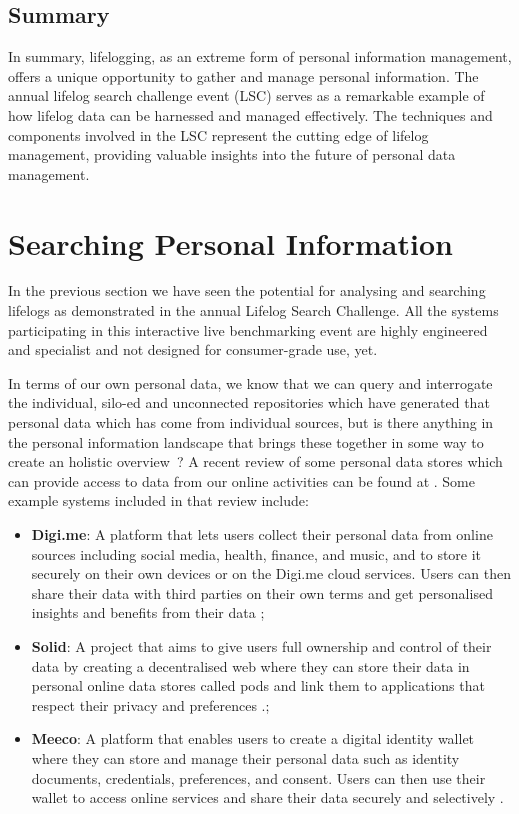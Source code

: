 \documentclass[11pt]{article}
\begin{document}
\subsection{Summary}

In summary, lifelogging, as an extreme form of personal information management, offers a unique opportunity to gather and manage personal information. The annual lifelog search challenge event (LSC) serves as a remarkable example of how lifelog data can be harnessed and managed effectively. The techniques and components involved in the LSC represent the cutting edge of lifelog management, providing valuable insights into the future of personal data management. 

\section{Searching Personal Information}

In the previous section we have seen the potential for analysing and searching lifelogs as demonstrated in the annual Lifelog Search Challenge. All the systems participating in this interactive live benchmarking event are highly engineered and specialist and not designed for consumer-grade use, yet. 

In terms of our own personal data, we know that we can query and interrogate the individual, silo-ed and unconnected repositories which have generated that personal data which has come from individual sources, but is there anything in the personal information landscape that brings these together in some way to create an holistic overview~?
A recent  review of some personal data stores which can provide access to data from our online activities can be found at \cite{s23031477}. Some example systems included in that review include:

\begin{itemize}

\item {\bf Digi.me}: A platform that lets users collect their personal data from  online sources including social media, health, finance, and music, and to store it securely on their own devices or on the Digi.me cloud services. Users can then share their data with third parties on their own terms and get personalised insights and benefits from their data \cite{janssen2020personal};

\item {\bf Solid}: A project that aims to give users full ownership and control of their data by creating a decentralised web where they can store their data in personal online data stores called pods and link them to applications that respect their privacy and preferences \cite{jesus2020solid}.;

\item {\bf Meeco}: A platform that enables users to create a digital identity wallet where they can store and manage their personal data such as identity documents, credentials, preferences, and consent. Users can then use their wallet to access online services and share their data securely and selectively \cite{s23031477}.

\end{itemize}
\end{document}
